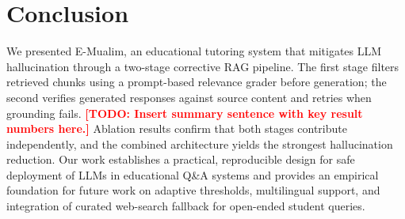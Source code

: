 \documentclass[conference]{IEEEtran}
\newcommand{\todo}[1]{\textcolor{red}{\textbf{[TODO: #1]}}}
\begin{document}
\section{Conclusion}
\label{sec:conclusion}

We presented E-Mualim, an educational tutoring system that mitigates
LLM hallucination through a two-stage corrective RAG pipeline.
The first stage filters retrieved chunks using a prompt-based
relevance grader before generation; the second verifies generated
responses against source content and retries when grounding fails.
\todo{Insert summary sentence with key result numbers here.}
Ablation results confirm that both stages contribute independently,
and the combined architecture yields the strongest hallucination
reduction.
Our work establishes a practical, reproducible design for safe
deployment of LLMs in educational Q\&A systems and provides an
empirical foundation for future work on adaptive thresholds,
multilingual support, and integration of curated web-search fallback
for open-ended student queries.



\end{document}
